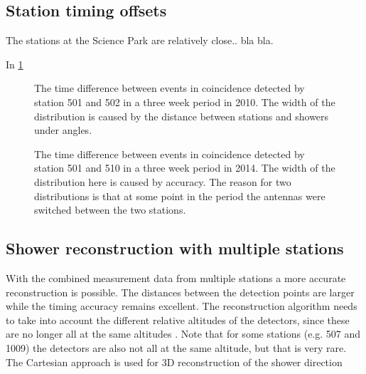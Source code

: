 \subsection{Station timing offsets}

The \hisparc stations at the Science Park are relatively close.. bla bla.


In \cref{fig:station_offsets_501_502}
\begin{figure}
    \centering
    
    \caption{ The
             time difference between events in coincidence detected by
             station 501 and 502 in a three week period in 2010. The
             width of the distribution is caused by the distance between
             stations and showers under angles.}
    \label{fig:station_offsets_501_502}
\end{figure}

\begin{figure}
    \centering
    
    \caption{ The
             time difference between events in coincidence detected by
             station 501 and 510 in a three week period in 2014. The
             width of the distribution here is caused by \gps accuracy.
             The reason for two distributions is that at some point in
             the period the \gps antennas were switched between the two
             stations.}
    \label{fig:station_offsets_501_510}
\end{figure}


\subsection{Shower reconstruction with multiple stations}

With the combined measurement data from multiple stations a more accurate reconstruction is possible. The distances between the detection points are larger while the timing accuracy remains excellent. The reconstruction algorithm needs to take into account the different relative altitudes of the detectors, since these are no longer all at the same altitudes \cite{steijger2012direction}. Note that for some stations (e.g. 507 and 1009) the detectors are also not all at the same altitude, but that is very rare. The Cartesian approach is used for 3D reconstruction of the shower direction \cite{montanus2015direction}

